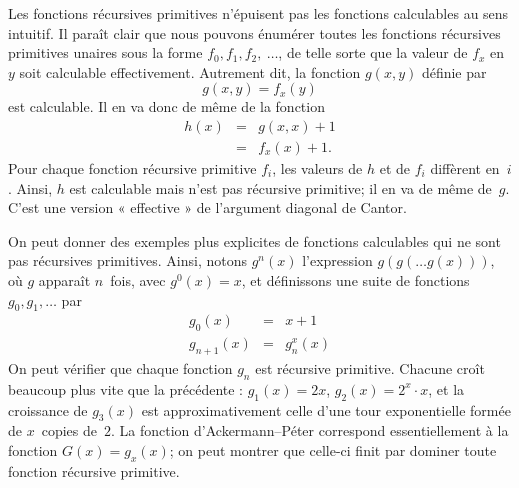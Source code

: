 \documentclass[../../../include/open-logic-section]{subfiles}
\begin{document}

Les fonctions récursives primitives n'épuisent pas les fonctions
calculables au sens intuitif. Il paraît clair que nous pouvons
énumérer toutes les fonctions récursives primitives unaires sous
la forme $f_0,f_1,f_2,~\dots$, de telle sorte que la valeur de
$f_x$ en~$y$ soit calculable effectivement. Autrement dit, la
fonction $g(x,y)$ définie par
\[
g(x,y) = f_x(y)
\]
est calculable. Il en va donc de même de la fonction
\begin{eqnarray*}
h(x) & = & g(x,x) + 1 \\
& = & f_x(x) +1.
\end{eqnarray*}
Pour chaque fonction récursive primitive $f_i$, les valeurs de
$h$ et de $f_i$ diffèrent en~$i$. Ainsi, $h$ est calculable
mais n'est pas récursive primitive; il en va de même de~$g$.
C'est une version « effective » de l'argument diagonal de Cantor.

On peut donner des exemples plus explicites de fonctions calculables
qui ne sont pas récursives primitives. Ainsi, notons $g^n(x)$
l'expression $g(g(\dots g(x)))$, où $g$ apparaît $n$~fois, avec $g^0(x)=x$, et
définissons une suite de fonctions $g_0,g_1,\dots$ par
\begin{eqnarray*}
g_0(x) & = & x+1 \\
g_{n + 1}(x) & = & g_n^x(x)
\end{eqnarray*}
On peut vérifier que chaque fonction $g_n$ est récursive primitive.
Chacune croît beaucoup plus vite que la précédente :
$g_1(x)=2x$, $g_2(x)=2^x\cdot x$, et la croissance de
$g_3(x)$ est approximativement celle d'une tour exponentielle
formée de $x$~copies de~$2$. La fonction d'Ackermann--Péter
correspond essentiellement à la fonction $G(x)=g_x(x)$;
on peut montrer que celle-ci finit par dominer toute fonction
récursive primitive.
\end{document}
